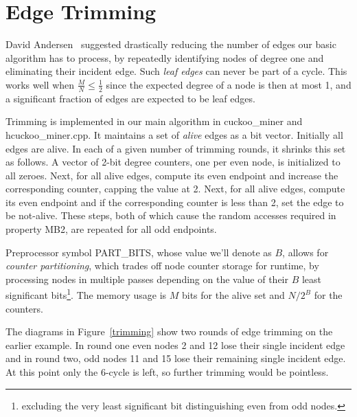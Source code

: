 \documentclass[11pt, oneside]{article}
\begin{document}
\section{Edge Trimming}
\label{edge_trimming}
David Andersen~\cite{dga2014} suggested drastically reducing the number of edges
our basic algorithm has to process, by repeatedly identifying nodes of degree one
and eliminating their incident edge. Such {\em leaf edges} can never be part of a cycle.
This works well when $\frac{M}{N} \leq \frac{1}{2}$ since the expected degree of a node is then at most 1,
and a significant fraction of edges are expected to be leaf edges.

Trimming is implemented in our main algorithm in cuckoo\_miner and hcuckoo\_miner.cpp.
It maintains a set of {\em alive} edges as a bit vector. Initially all edges are alive.
In each of a given number of trimming rounds, it shrinks this set as follows.
A vector of 2-bit degree counters, one per even node, is initialized to all zeroes.
Next, for all alive edges, compute its even endpoint and increase the corresponding counter,
capping the value at 2.
Next, for all alive edges, compute its even endpoint and if the corresponding counter is less than 2,
set the edge to be not-alive.
These steps, both of which cause the random accesses required in property MB2,
are repeated for all odd endpoints.

Preprocessor symbol PART\_BITS, whose value we'll denote as $B$,
allows for {\em counter partitioning}, which trades off node counter storage for runtime,
by processing nodes in multiple passes depending on the value of their $B$ least significant
bits\footnote{excluding the very least significant bit distinguishing even from odd nodes.}.
The memory usage is $M$ bits for the alive set and $N / 2^{B}$ for the counters.

The diagrams in Figure~\ref{trimming} show two rounds of edge trimming on the earlier example. In round one
even nodes 2 and 12 lose their single incident edge and in round two, odd nodes 11 and 15 lose
their remaining single incident edge. At this point only the 6-cycle is left, so further trimming
would be pointless.
\end{document}
